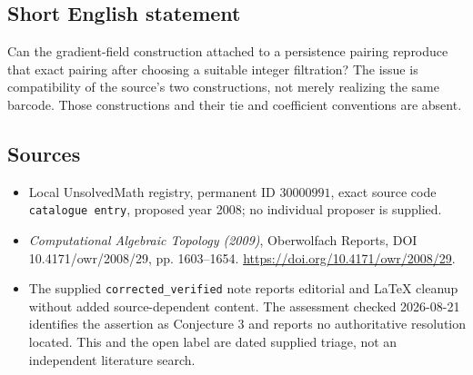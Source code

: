 \documentclass[11pt]{article}
\begin{document}
\subsection{Short English statement}
Can the gradient-field construction attached to a persistence pairing reproduce that exact pairing after choosing a suitable integer filtration? The issue is compatibility of the source's two constructions, not merely realizing the same barcode. Those constructions and their tie and coefficient conventions are absent.
\subsection{Sources}
\begin{itemize}
\item Local UnsolvedMath registry, permanent ID \(30000991\), exact source code \texttt{catalogue entry}, proposed year 2008; no individual proposer is supplied.
\item \emph{Computational Algebraic Topology (2009)}, Oberwolfach Reports, DOI 10.4171/owr/2008/29, pp. 1603--1654. \url{https://doi.org/10.4171/owr/2008/29}.
\item The supplied \texttt{corrected\_verified} note reports editorial and LaTeX cleanup without added source-dependent content. The assessment checked 2026-08-21 identifies the assertion as Conjecture 3 and reports no authoritative resolution located. This and the open label are dated supplied triage, not an independent literature search.
\end{itemize}
\end{document}
